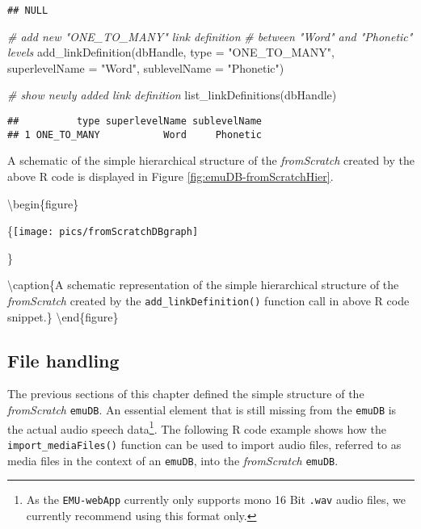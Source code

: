 \documentclass[
]{book}
\newenvironment{Shaded}{\begin{snugshade}}{\end{snugshade}}
\newcommand{\AttributeTok}[1]{\textcolor[rgb]{0.77,0.63,0.00}{#1}}
\newcommand{\CommentTok}[1]{\textcolor[rgb]{0.56,0.35,0.01}{\textit{#1}}}
\newcommand{\FunctionTok}[1]{\textcolor[rgb]{0.00,0.00,0.00}{#1}}
\newcommand{\NormalTok}[1]{#1}
\newcommand{\StringTok}[1]{\textcolor[rgb]{0.31,0.60,0.02}{#1}}
\begin{document}
\begin{verbatim}
## NULL
\end{verbatim}

\begin{Shaded}
\begin{Highlighting}[]
\CommentTok{\# add new "ONE\_TO\_MANY" link definition}
\CommentTok{\# between "Word" and "Phonetic" levels}
\FunctionTok{add\_linkDefinition}\NormalTok{(dbHandle,}
                   \AttributeTok{type =} \StringTok{"ONE\_TO\_MANY"}\NormalTok{,}
                   \AttributeTok{superlevelName =} \StringTok{"Word"}\NormalTok{,}
                   \AttributeTok{sublevelName =} \StringTok{"Phonetic"}\NormalTok{)}

\CommentTok{\# show newly added link definition}
\FunctionTok{list\_linkDefinitions}\NormalTok{(dbHandle)}
\end{Highlighting}
\end{Shaded}

\begin{verbatim}
##          type superlevelName sublevelName
## 1 ONE_TO_MANY           Word     Phonetic
\end{verbatim}

A schematic of the simple hierarchical structure of the \emph{fromScratch} created by the above R code is displayed in Figure \ref{fig:emuDB-fromScratchHier}.

\textbackslash begin\{figure\}

\{\centering \texttt{[image: pics/fromScratchDBgraph]}

\}

\textbackslash caption\{A schematic representation of the simple hierarchical structure of the \emph{fromScratch} created by the \texttt{add\_linkDefinition()} function call in above R code snippet.\}\label{fig:emuDB-fromScratchHier}
\textbackslash end\{figure\}

\hypertarget{file-handling}{%
\subsection{File handling}\label{file-handling}}

The previous sections of this chapter defined the simple structure of the \emph{fromScratch} \texttt{emuDB}. An essential element that is still missing from the \texttt{emuDB} is the actual audio speech data\footnote{As the \texttt{EMU-webApp} currently only supports mono 16 Bit \texttt{.wav} audio files, we currently recommend using this format only.}. The following R code example shows how the \texttt{import\_mediaFiles()} function can be used to import audio files, referred to as media files in the context of an \texttt{emuDB}, into the \emph{fromScratch} \texttt{emuDB}.
\end{document}
